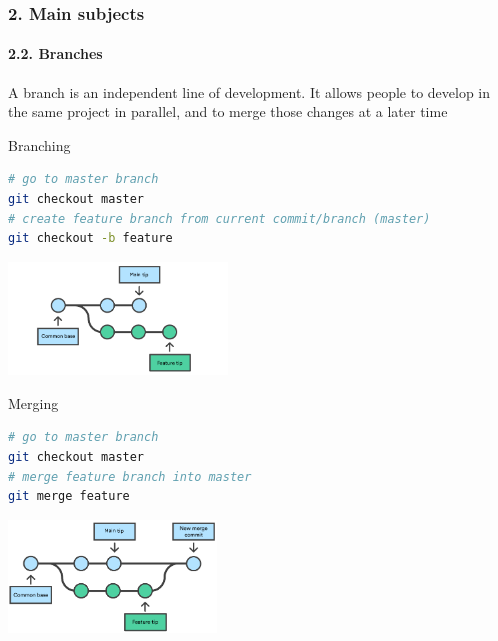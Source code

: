 \documentclass[dvipsnames]{beamer}
\begin{document}
\begin{frame}[fragile]
\frametitle{2. Main subjects}
\framesubtitle{2.2. Branches}

A branch is an independent line of development. It allows people to develop in the same project in parallel, and to merge those changes at a later time

\vspace{0.5em}

\begin{minipage}{0.5\textwidth}
  \centering
  
  Branching

  \begin{lstlisting}[language=bash]
# go to master branch
git checkout master
# create feature branch from current commit/branch (master)
git checkout -b feature
  \end{lstlisting}

  \includegraphics[height=30mm]{img/branch.png}
\end{minipage}%
\begin{minipage}{0.5\textwidth}
  \centering
  
  Merging

  \begin{lstlisting}[language=bash]
# go to master branch
git checkout master
# merge feature branch into master
git merge feature
  \end{lstlisting}
  
  \includegraphics[height=30mm]{img/merge.png}
\end{minipage}%

\end{frame}
\end{document}
